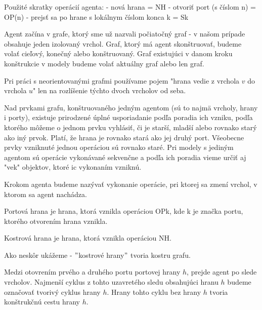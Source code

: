 \begin{ozn}
Použité skratky operácií agenta:
- nová hrana = NH
- otvoriť port (s číslom n) = OP(n)
- prejsť sa po hrane s lokálnym číslom konca k = Sk
\end{ozn}

\begin{ozn}
Agent začína v grafe, ktorý sme už nazvali počiatočný graf - v našom prípade
obsahuje jeden izolovaný vrchol. Graf, ktorý má agent skonštruovať, budeme
volať cieľový, konečný alebo konštruovaný. Graf existujúci v danom kroku
konštrukcie v modely budeme volať aktuálny graf alebo len graf.
\end{ozn}

\begin{pozn}
Pri práci s neorientovanými grafmi používame pojem "hrana vedie z vrchola
$v$
do vrchola $u$" len na rozlíšenie týchto dvoch vrcholov od seba.
\end{pozn}

\begin{ozn}
Nad prvkami grafu, konštruovaného jedným agentom
  (sú to najmä vrcholy, hrany i porty), existuje prirodzené úplné
usporiadanie podľa poradia ich vzniku, podľa ktorého môžeme o jednom prvku
vyhlásiť, či je starší, mladší alebo rovnako starý ako iný prvok. Platí, že
hrana je rovnako stará ako jej druhý port. Všeobecne prvky vzniknuté jednou
operáciou sú rovnako staré. Pri modely s jediným agentom sú operácie
vykonávané sekvenčne a podľa ich poradia vieme určiť aj "vek" objektov,
ktoré ic vykonaním vzniknú.
\end{ozn}

\begin{ozn}
Krokom agenta budeme nazývať vykonanie operácie, pri ktorej sa zmení vrchol,
v ktorom sa agent nachádza.
\end{ozn}

\begin{ozn}
Portová hrana je hrana, ktorá vznikla operáciou OPk, kde k je značka portu,
ktorého otvorením hrana vznikla.
\end{ozn}
\begin{ozn}
Kostrová hrana je hrana, ktorá vznikla operáciou NH.
\end{ozn}
\begin{pozn}
Ako neskôr ukážeme - $"$kostrové hrany$"$ tvoria kostru grafu.
\end{pozn}

\begin{ozn}
Medzi otovrením prvého a druhého portu portovej hrany $h$, prejde agent po slede
vrcholov. Najmenší cyklus z tohto uzavretého sledu obsahujúci
 hranu $h$ budeme označovať tvorivý cyklus hrany $h$. Hrany tohto cyklu bez
hrany $h$ tvoria konštrukčnú cestu hrany $h$.
\end{ozn}

